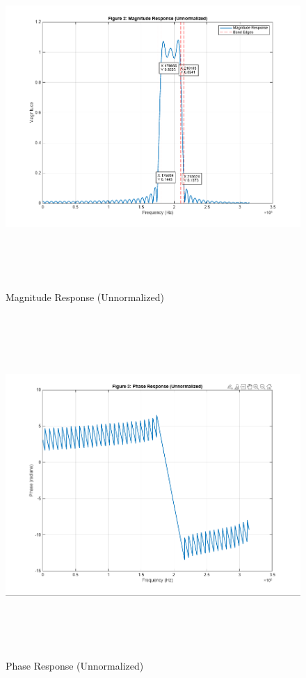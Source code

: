 \documentclass[12pt]{article}
\begin{document}
\begin{figure}[H]
    \centering
    \includegraphics[height=13cm]{g28.png}
    \caption{Magnitude Response (Unnormalized)}
    \label{fig:mag_response_g2}
\end{figure}

\begin{figure}[H]
    \centering
    \includegraphics[height=13cm]{g23.png}
    \caption{Phase Response (Unnormalized)}
    \label{fig:phase_response_g2}
\end{figure}
\end{document}
